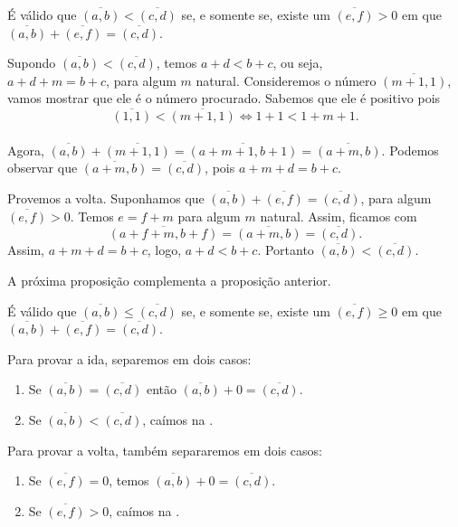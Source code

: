 \documentclass[../main.tex]{subfiles}
\begin{document}
\begin{prop}\label{int-prop-AMenorBAMaisCIgualB}
    É válido que $\overline{(a,b)} < \overline{(c,d)}$ se, e somente se, existe um $\overline{(e,f)} > 0$ em que  $\overline{(a,b)} + \overline{(e,f)} = \overline{(c,d)}$.
\end{prop}
\begin{dem}
    Supondo $\overline{(a,b)} < \overline{(c,d)}$, temos $a+d < b+c$, ou seja, \\ 
    $a+d + m = b+c$, para algum $m$ natural. Consideremos o número $\overline{(m+1, 1)}$, vamos mostrar que ele é o número procurado. Sabemos que ele é positivo pois 
    \[ \overline{(1,1)} < \overline{(m+1, 1)} \iff 1+1 < 1+m+1. \] \\
    Agora, $\overline{(a,b)} + \overline{(m+1,1)} = \overline{(a+m+1,b+1)} = \overline{(a+m, b)}$.
    Podemos observar que $\overline{(a+m, b)} = \overline{(c,d)}$, pois $a+m+d = b+c$.

    Provemos a volta. Suponhamos que $\overline{(a,b)} + \overline{(e,f)} = \overline{(c,d)}$, para algum $\overline{(e,f)} > 0$. Temos $e=f+m$ para algum $m$ natural. Assim, ficamos com 
    \[ \overline{(a+f+m, b+f)} = \overline{(a+m, b)} = \overline{(c,d)}. \] 
    Assim, $a+m+d = b+c$, logo, $a+d < b+c$. Portanto $ \overline{(a,b)} < \overline{(c,d)}$.
\end{dem}

A próxima proposição complementa a proposição anterior.
\begin{prop}
    É válido que $\overline{(a,b)} \leq \overline{(c,d)}$ se, e somente se, existe um $\overline{(e,f)} \geq 0$ em que $\overline{(a,b)} + \overline{(e,f)} = \overline{(c,d)}$. 
\end{prop}
\begin{dem}
    Para provar a ida, separemos em dois casos:
    \begin{enumerate}[label=(\roman*)]
        \item Se $\overline{(a,b)} = \overline{(c,d)}$ então $\overline{(a,b)} + 0 = \overline{(c,d)}$.
        \item Se $\overline{(a,b)} < \overline{(c,d)}$, caímos na .
    \end{enumerate} 
    Para provar a volta, também separaremos em dois casos:    
    \begin{enumerate}[label=(\roman*)]
        \item Se $\overline{(e,f)} = 0$, temos $\overline{(a,b)} + 0 = \overline{(c,d)}$.
        \item Se $\overline{(e,f)} > 0$, caímos na .
    \end{enumerate} 
\end{dem}
\end{document}
